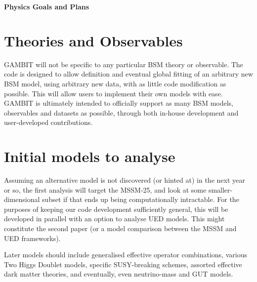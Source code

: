 

\centerline{\textbf{Physics Goals and Plans}}\bigskip 

\section{Theories and Observables}

GAMBIT will not be specific to any particular BSM theory or observable.  The code is designed to allow definition and eventual global fitting of an arbitrary new BSM model, using arbitrary new data, with as little code modification as possible.  This will allow users to implement their own models with ease.  GAMBIT is ultimately intended to officially support as many BSM models, observables and datasets as possible, through both in-house development and user-developed contributions.

\section{Initial models to analyse}

Assuming an alternative model is not discovered (or hinted at) in the next year or so, the first analysis will target the MSSM-25, and look at some smaller-dimensional subset if that ends up being computationally intractable.  For the purposes of keeping our code development sufficiently general, this will be developed in parallel with an option to analyse UED models.  This might constitute the second paper (or a model comparison between the MSSM and UED frameworks).

Later models should include generalised effective operator combinations, various Two Higgs Doublet models, specific SUSY-breaking schemes, assorted effective dark matter theories, and eventually, even neutrino-mass and GUT models.


